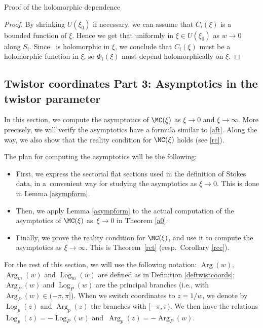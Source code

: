 \begin{subsubsection}{Proof of the holomorphic dependence}
\begin{proof}
By shrinking $U(\xi_0)$ if necessary, we can assume that $C_i(\xi)$ is a bounded function of $\xi$. Hence we get that
uniformly in $\xi \in U(\xi_0)$ as $w\to 0$ along $S_i$. Since~ is holomorphic in $\xi$, we conclude that $C_i(\xi)$ must be a holomorphic function in $\xi$, so $\Phi_i(\xi)$ must depend holomorphically on $\xi$.
\end{proof}
\end{subsubsection}


\subsection{Twistor coordinates Part 3: Asymptotics in the twistor parameter}

In this section, we compute the asymptotics of $\MC(\xi)$ as $\xi \to 0$ and $\xi \to \infty$. More precisely, we will verify the asymptotics have a formula similar to \eqref{aft}. Along the way, we also show that the reality condition for $\MC(\xi)$ holds (see \eqref{rc}).

The plan for computing the asymptotics will be the following:
\begin{itemize}\itemsep=0pt
 \item First, we express the sectorial flat sections used in the definition of Stokes data, in a~convenient way for studying the asymptotics as $\xi \to 0$. This is done in Lemma \ref{asympform}.
 \item Then, we apply Lemma \ref{asympform} to the actual computation of the asymptotics of $\MC(\xi)$ as~${\xi \to 0}$ in Theorem \ref{a0}.
 \item Finally, we prove the reality condition for $\MC(\xi)$, and use it to compute the asymptotics as $\xi\to \infty$. This is Theorem~\ref{rct} (resp.~Corollary \ref{rcc}).
\end{itemize}

\begin{Notation} For the rest of this section, we will use the following notation: $\operatorname{Arg}(w)$, $\operatorname{Arg}_m(w)$ and $\operatorname{Log}_m(w)$ are defined as in Definition \ref{deftwistcoords}; $\operatorname{Arg}_P(w)$ and $\operatorname{Log}_P(w)$ are the principal branches (i.e., with $\operatorname{Arg}_P(w)\in (-\pi,\pi]$). When we switch coordinates to $z=1/w$, we denote by $\operatorname{Log}_p(z)$ and $\operatorname{Arg}_p(z)$ the branches with $[-\pi,\pi)$. We then have the relations $\operatorname{Log}_{p}(z)=-\operatorname{Log}_P(w)$ and~${\operatorname{Arg}_{p}(z)=-\operatorname{Arg}_P(w)}$.
\end{Notation}

